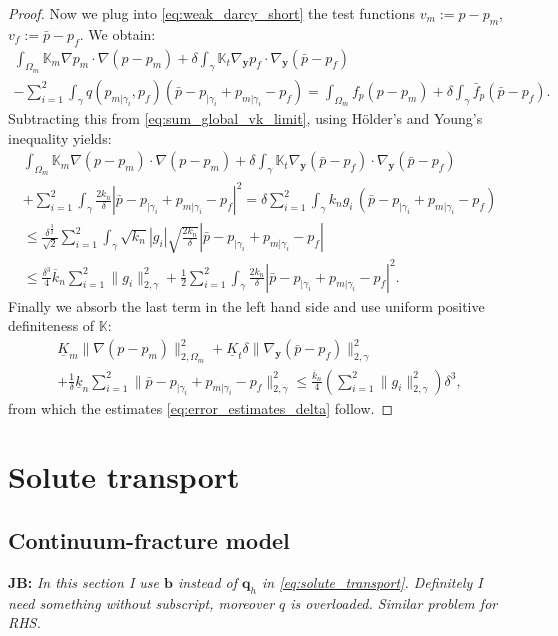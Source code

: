 \documentclass[a4paper]{article}
\def\vc#1{\mathbf{\boldsymbol{#1}}}     %
\def\tn#1{{\mathbb{#1}}}    %
\def\norm#1{\|#1\|}
\def\yy{{\vc y}}
\newcommand{\note}[2]{{\color{blue} \textbf{ #1:} \textit{#2}}}
\begin{document}
\begin{proof}
Now we plug into \eqref{eq:weak_darcy_short} the test functions $v_m:=p-p_m$, $v_f:=\bar p-p_f$.
We obtain:
\begin{multline*}
\int_{\Omega_m}\tn K_m\nabla p_m\cdot\nabla(p-p_m) + \delta\int_\gamma\tn K_t\nabla_\yy p_f\cdot\nabla_\yy(\bar p-p_f)\\
- \sum_{i=1}^2\int_\gamma q(p_{m|\gamma_i},p_f)(\bar p - p_{|\gamma_i}+p_{m|\gamma_i} - p_f)
= \int_{\Omega_m} f_p(p-p_m)
+ \delta\int_\gamma\bar f_p(\bar p-p_f).
\end{multline*}
Subtracting this from \eqref{eq:sum_global_vk_limit}, using H\"older's and Young's inequality yields:
\begin{multline}
\int_{\Omega_m}\tn K_m\nabla (p-p_m)\cdot\nabla(p-p_m)
+\delta\int_\gamma\tn K_t\nabla_\yy(\bar p-p_f)\cdot\nabla_\yy(\bar p-p_f)\\
+ \sum_{i=1}^2\int_\gamma \frac{2k_n}\delta |\bar p - p_{|\gamma_i} + p_{m|\gamma_i} - p_f|^2
= \delta\sum_{i=1}^2\int_\gamma k_n g_i\, (\bar p - p_{|\gamma_i} + p_{m|\gamma_i} - p_f)\\
\le \frac{\delta^{\frac32}}{\sqrt2}\sum_{i=1}^2\int_\gamma \sqrt{k_n}|g_i|\sqrt{\frac{2k_n}\delta}|\bar p - p_{|\gamma_i} + p_{m|\gamma_i} - p_f|\\
\le \frac{\delta^3}4\overline k_n\sum_{i=1}^2\norm{g_i}_{2,\gamma}^2 + \frac12\sum_{i=1}^2\int_\gamma \frac{2k_n}\delta |\bar p - p_{|\gamma_i} + p_{m|\gamma_i} - p_f|^2.
\end{multline}
Finally we absorb the last term in the left hand side and use uniform positive definiteness of $\tn K$:
\begin{multline}
\underline K_m\norm{\nabla (p-p_m)}_{2,\Omega_m}^2
+\underline K_t\delta\norm{\nabla_\yy(\bar p-p_f)}_{2,\gamma}^2\\
+ \frac1\delta\underline k_n\sum_{i=1}^2\norm{\bar p - p_{|\gamma_i} + p_{m|\gamma_i} - p_f}_{2,\gamma}^2
\le \frac{\overline k_n}4\left(\sum_{i=1}^2\norm{g_i}_{2,\gamma}^2\right)\delta^3,
\end{multline}
from which the estimates \eqref{eq:error_estimates_delta} follow.
\end{proof}

\section{Solute transport}
\subsection{Continuum-fracture model}
\note{JB}{In this section I use $\vc b$ instead of $\vc q_h$ in \eqref{eq:solute_transport}. Definitely I need something without subscript, moreover $q$ is overloaded.
Similar problem for RHS.}
\end{document}

